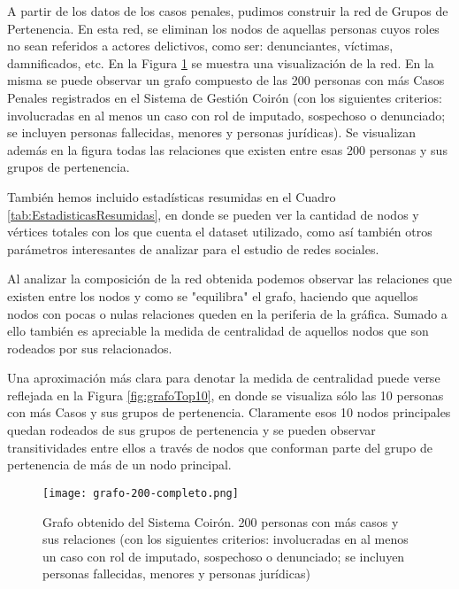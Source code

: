 A partir de los datos de los casos penales, pudimos construir la red de Grupos de Pertenencia. En esta red, se eliminan los nodos de aquellas personas cuyos roles no sean referidos a actores delictivos, como ser: denunciantes, víctimas, damnificados, etc. En la Figura \ref{fig:grafocompleto} se muestra una visualización de la red. En la misma se puede observar un grafo compuesto de las 200 personas con más Casos Penales registrados en el Sistema de Gestión Coirón (con los siguientes criterios: involucradas en al menos un caso con rol de imputado, sospechoso o denunciado; se incluyen personas fallecidas, menores y personas jurídicas). Se visualizan además en la figura todas las relaciones que existen entre esas 200 personas y sus grupos de pertenencia.

También hemos incluido estadísticas resumidas en el Cuadro  \ref{tab:EstadisticasResumidas}, en donde se pueden ver la cantidad de nodos y vértices totales con los que cuenta el dataset utilizado, como así también otros parámetros interesantes de analizar para el estudio de redes sociales.

Al analizar la composición de la red obtenida podemos observar las relaciones que existen entre los nodos y como se "equilibra" el grafo, haciendo que aquellos nodos con pocas o nulas relaciones queden en la periferia de la gráfica. Sumado a ello también es apreciable la medida de centralidad de aquellos nodos que son rodeados por sus relacionados.

Una aproximación más clara para denotar la medida de centralidad puede verse reflejada en la Figura \ref{fig:grafoTop10}, en donde se visualiza sólo las 10 personas con más Casos y sus grupos de pertenencia. Claramente esos 10 nodos principales quedan rodeados de sus grupos de pertenencia y se pueden observar transitividades entre ellos a través de nodos que conforman parte del grupo de pertenencia de más de un nodo principal.



\begin{figure}
	\centering
	\texttt{[image: grafo-200-completo.png]}
	\caption{Grafo obtenido del Sistema Coirón. 200 personas con más casos y sus relaciones (con los siguientes criterios: involucradas en al menos un caso con rol de imputado, sospechoso o denunciado; se incluyen personas fallecidas, menores y personas jurídicas)} 
	\label{fig:grafocompleto}
\end{figure}


